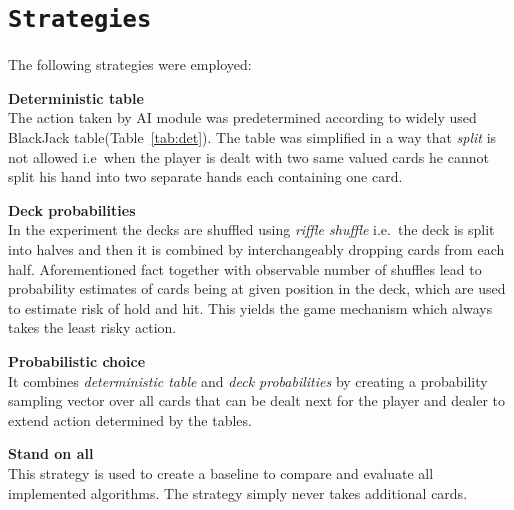 \documentclass[12pt,a4paper,twocolumn]{article}
\begin{document}
\section*{\texttt{Strategies}}
The following strategies were employed:
\begin{description}
\item{\textbf{Deterministic table}} \hfill\\
The action taken by AI module was predetermined according to widely used BlackJack table(Table~\ref{tab:det}). The table was simplified in a way that \emph{split} is not allowed i.e\ when the player is dealt with two same valued cards he cannot split his hand into two separate hands each containing one card.
\item{\textbf{Deck probabilities}} \hfill\\
In the experiment the decks are shuffled using \emph{riffle shuffle} i.e.\ the deck is split into halves and then it is combined by interchangeably dropping cards from each half. Aforementioned fact together with observable number of shuffles lead to probability estimates of cards being at given position in the deck, which are used to estimate risk of hold and hit. This yields the game mechanism which always takes the least risky action.
\item{\textbf{Probabilistic choice}} \hfill\\
It combines \emph{deterministic table} and \emph{deck probabilities} by creating a probability sampling vector over all cards that can be dealt next for the player and dealer to extend action determined by the tables.
\item{\textbf{Stand on all}} \hfill\\
This strategy is used to create a baseline to compare and evaluate all implemented algorithms. The strategy simply never takes additional cards.
\end{description}
\end{document}
